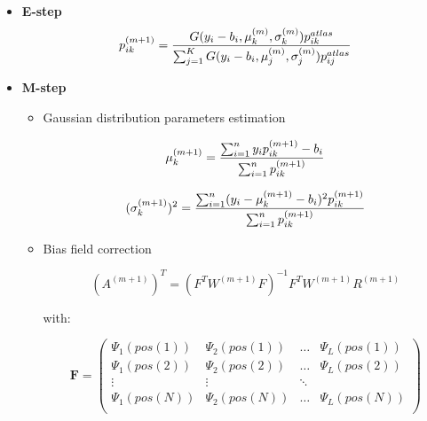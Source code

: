 \begin{itemize}

\item\textbf{E-step}\\
  \begin{equation*}
  p_{ik}^{(m+1)}= \frac{G(y_i-b_i,\mu_k^{(m)},\sigma_k^{(m)})p_{ik}^{atlas}}{\sum_{j=1}^K G(y_i-b_i,\mu_j^{(m)},\sigma_j^{(m)})p_{ij}^{atlas}}\\
  \end{equation*}
  
\item\textbf{M-step}\\
  \begin{itemize}

  \item Gaussian distribution parameters estimation
    
    \begin{equation*}
    \mu_k^{(m+1)} = \frac{\sum_{i=1}^n y_ip_{ik}^{(m+1)}-b_i}{\sum_{i=1}^n p_{ik}^{(m+1)}}\\
    \end{equation*}

    \begin{equation*}
    (\sigma_k^{(m+1)})^2 = \frac{\sum_{i=1}^n (y_i-\mu_k^{(m+1)}-b_i)^2p_{ik}^{(m+1)}}{\sum_{i=1}^n p_{ik}^{(m+1)}}\\
    \end{equation*}

  \item Bias field correction

  \begin{equation*}  
  (A^{(m+1)})^T = (F^TW^{(m+1)}F)^{-1}F^TW^{(m+1)}R^{(m+1)}  
  \end{equation*}

with:

  \begin{equation*}
   \mathbf{F} = \left(
  \begin{array}{clcr}
   \Psi_1(pos(1)) & \Psi_2(pos(1)) & \ldots & \Psi_L(pos(1)) \\
   \Psi_1(pos(2)) & \Psi_2(pos(2)) & \ldots & \Psi_L(pos(2)) \\
   \vdots & \vdots & \ddots \\
   \Psi_1(pos(N)) & \Psi_2(pos(N)) & \ldots & \Psi_L(pos(N)) \\
  \end{array} \right)
  \end{equation*}
  

\end{itemize}
\end{itemize}
